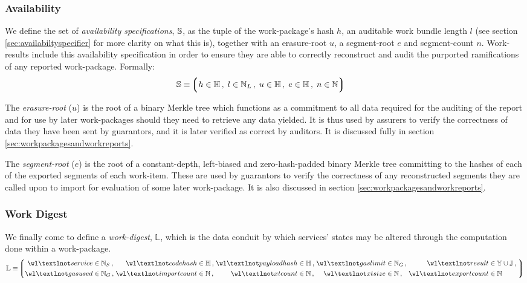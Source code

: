\subsubsection{Availability}
We define the set of \emph{availability specifications}, $\mathbb{S}$, as the tuple of the work-package's hash $h$, an auditable work bundle length $l$ (see section \ref{sec:availabiltyspecifier} for more clarity on what this is), together with an erasure-root $u$, a segment-root $e$ and segment-count $n$. Work-results include this availability specification in order to ensure they are able to correctly reconstruct and audit the purported ramifications of any reported work-package. Formally:
\begin{align}
  \avspec &\equiv \tuple{
    \isa{h}{\H}\,,\;
    \isa{l}{\N_L}\,,\;
    \isa{u}{\H}\,,\;
    \isa{e}{\H}\,,\;
    \isa{n}{\N}
  }
\end{align}

The \emph{erasure-root} ($u$) is the root of a binary Merkle tree which functions as a commitment to all data required for the auditing of the report and for use by later work-packages should they need to retrieve any data yielded. It is thus used by assurers to verify the correctness of data they have been sent by guarantors, and it is later verified as correct by auditors. It is discussed fully in section \ref{sec:workpackagesandworkreports}.

The \emph{segment-root} ($e$) is the root of a constant-depth, left-biased and zero-hash-padded binary Merkle tree committing to the hashes of each of the exported segments of each work-item. These are used by guarantors to verify the correctness of any reconstructed segments they are called upon to import for evaluation of some later work-package. It is also discussed in section \ref{sec:workpackagesandworkreports}.

\subsubsection{Work Digest}
We finally come to define a \emph{work-digest}, $\mathbb{L}$, which is the data conduit by which services' states may be altered through the computation done within a work-package.
\begin{equation}\label{eq:workdigest}
  \mathbb{L} \equiv \tuple{
    \begin{alignedat}{9}
      \isa{\wl¬service&}{\N_S}\,,\;
      \isa{&\wl¬codehash&}{\H}\,,\;
      \isa{&\wl¬payloadhash&}{\H}\,,\;
      \isa{&\wl¬gaslimit&}{\N_G}\,,\;
      \isa{&\wl¬result&}{\Y \cup \mathbb{J}}\,,\;\\
      \isa{\wl¬gasused&}{\N_G}\,,\; %
      \isa{&\wl¬importcount&}{\N}\,,\; %
      \isa{&\wl¬xtcount&}{\N}\,,\; %
      \isa{&\wl¬xtsize&}{\N}\,,\; %
      \isa{&\wl¬exportcount&}{\N} %
    \end{alignedat}
  }
\end{equation}

